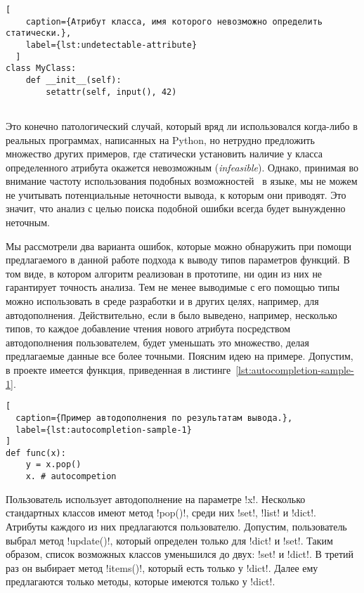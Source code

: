 \begin{description}
  \begin{lstlisting}[
    caption={Атрибут класса, имя которого невозможно определить статически.},
    label={lst:undetectable-attribute}
  ]
class MyClass:
    def __init__(self):
        setattr(self, input(), 42)
      
  \end{lstlisting} Это конечно патологический случай, который вряд ли
  использовался когда-либо в реальных программах, написанных на Python, но
  нетрудно предложить множество других примеров, где статически установить
  наличие у класса определенного атрибута окажется невозможным
  (\emph{infeasible}).  Однако, принимая во внимание частоту использования
  подобных возможностей~\cite{Holkner2009} в языке, мы не можем не учитывать
  потенциальные неточности вывода, к которым они приводят. Это значит, что
  анализ с целью поиска подобной ошибки всегда будет вынужденно неточным.

\end{description}

Мы рассмотрели два варианта ошибок, которые можно обнаружить при помощи
предлагаемого в данной работе подхода к выводу типов параметров функций.  В том
виде, в котором алгоритм реализован в прототипе, ни один из них не гарантирует
точность анализа. Тем не менее выводимые с его помощью типы можно использовать в
среде разработки и в других целях, например, для автодополнения.  Действительно,
если в было выведено, например, несколько типов, то каждое добавление
чтения нового атрибута посредством автодополнения пользователем, будет уменьшать
это множество, делая предлагаемые данные все более точными. Поясним идею на
примере. Допустим, в проекте имеется функция, приведенная в
листинге~\ref{lst:autocompletion-sample-1}. 

\begin{lstlisting}[
  caption={Пример автодополнения по результатам вывода.},
  label={lst:autocompletion-sample-1}
]
def func(x):
    y = x.pop()
    x. # autocompetion
\end{lstlisting}

Пользователь использует автодополнение на параметре !x!. Несколько стандартных
классов имеют метод !pop()!, среди них !set!, !list! и !dict!. Атрибуты каждого
из них предлагаются пользователю. Допустим, пользователь выбрал метод !update()!,
который определен только для !dict! и !set!. Таким образом, список возможных классов
уменьшился до двух: !set! и !dict!. В третий раз он выбирает метод !items()!,
который есть только у !dict!. Далее ему предлагаются только методы, которые
имеются только у !dict!. %

